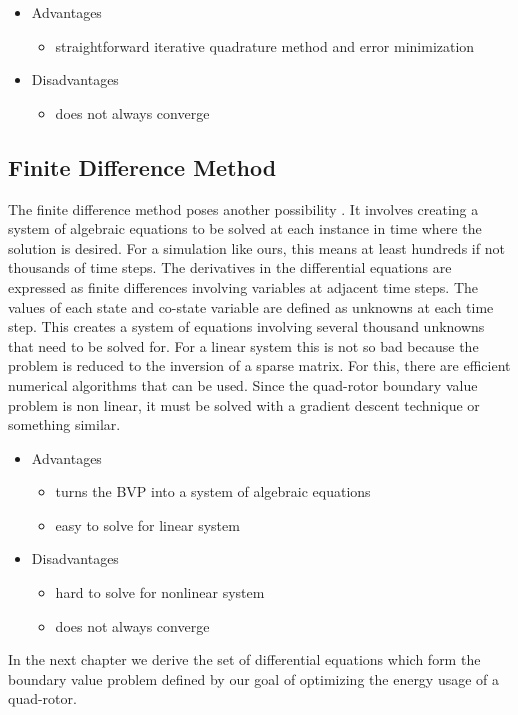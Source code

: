 \begin{itemize}
\item Advantages
    \begin{itemize}
        \item straightforward iterative quadrature method and error minimization
    \end{itemize}
\item Disadvantages
    \begin{itemize}
        \item does not always converge
    \end{itemize}
\end{itemize}




\subsection{Finite Difference Method}

The finite difference method poses another possibility \cite{rao2001applied}. It involves creating a system of algebraic equations to be solved at each instance in time where the solution is desired. For a simulation like ours, this means at least hundreds if not thousands of time steps. The derivatives in the differential equations are expressed as finite differences involving variables at adjacent time steps. The values of each state and co-state variable are defined as unknowns at each time step. This creates a system of equations involving several thousand unknowns that need to be solved for. For a linear system this is not so bad because the problem is reduced to the inversion of a sparse matrix. For this, there are efficient numerical algorithms that can be used. Since the quad-rotor boundary value problem is non linear, it must be solved with a gradient descent technique or something similar.

\begin{itemize}
\item Advantages
    \begin{itemize}
        \item turns the BVP into a system of algebraic equations
        \item easy to solve for linear system
    \end{itemize}
\item Disadvantages
    \begin{itemize}
        \item hard to solve for nonlinear system
        \item does not always converge
    \end{itemize}
\end{itemize}

In the next chapter we derive the set of differential equations which form the boundary value problem defined by our goal of optimizing the energy usage of a quad-rotor.




